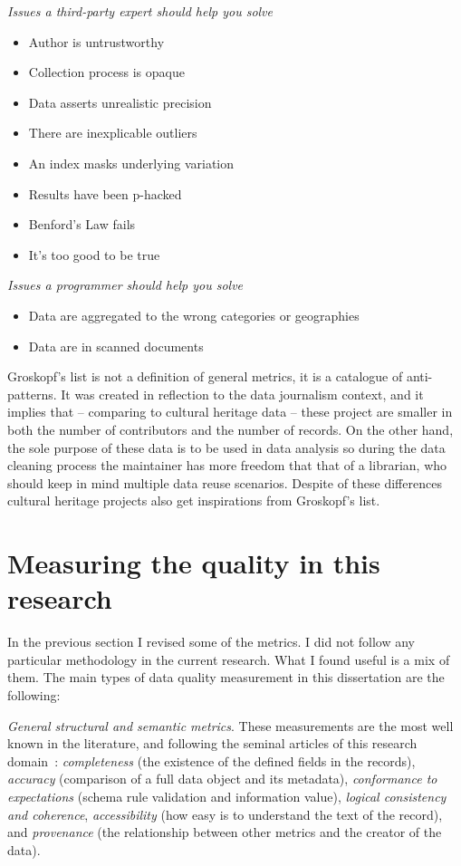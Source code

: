 \emph{Issues a third-party expert should help you solve}
\begin{itemize}
 \setlength{\parskip}{0pt}
 \setlength{\itemsep}{0pt plus 1pt}
 \item Author is untrustworthy
 \item Collection process is opaque
 \item Data asserts unrealistic precision
 \item There are inexplicable outliers
 \item An index masks underlying variation
 \item Results have been p-hacked
 \item Benford’s Law fails
 \item It’s too good to be true
\end{itemize}

\emph{Issues a programmer should help you solve}
\begin{itemize}
 \setlength{\parskip}{0pt}
 \setlength{\itemsep}{0pt plus 1pt}
 \item Data are aggregated to the wrong categories or geographies
 \item Data are in scanned documents
\end{itemize}

Groskopf's list is not a definition of general metrics, it is a catalogue of anti-patterns. It was created in reflection to the data journalism context, and it implies that -- comparing to cultural heritage data -- these  project are smaller in both the number of contributors and the number of records. On the other hand, the sole purpose of these data is to be used in data analysis so during the data cleaning process the maintainer has more freedom that that of a librarian, who should keep in mind multiple data reuse scenarios. Despite of these differences cultural heritage projects also get inspirations from Groskopf's list.

\section{Measuring the quality in this research}

In the previous section I revised some of the metrics. I did not follow any particular methodology in the current research. What I found useful is a mix of them. The main types of data quality measurement in this dissertation are the following:

\emph{General structural and semantic metrics}. These measurements are the most well known in the literature, and following the seminal articles of this research domain~\cite{bruce-hillmann2004, ochoa-duval2009}: \emph{completeness} (the existence of the defined fields in the records), \emph{accuracy} (comparison of a full data object and its metadata), \emph{conformance to expectations} (schema rule validation and information value), \emph{logical consistency and coherence}, \emph{accessibility} (how easy is to understand the text of the record), and \emph{provenance} (the relationship between other metrics and the creator of the data).

